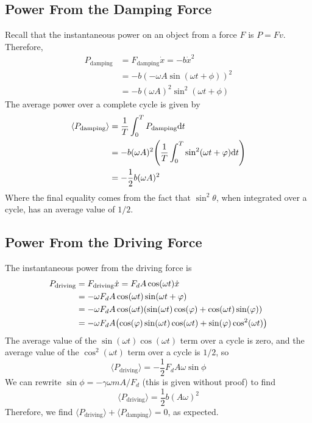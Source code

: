 \subsection*{Power From the Damping Force}
Recall that the instantaneous power on an object from a force $F$ is $P =  Fv$. Therefore, 
\begin{align*}
    P_\text{damping} &= F_\text{damping}\dot x = -b\dot x^2  \\
    &= -b(-\omega A\sin(\omega t+\phi))^2 \\
    &= -b(\omega A)^2\sin^2(\omega t+\phi)
\end{align*}
The average power over a complete cycle is given by
\begin{align*}
    \langle P_\text{damping}\rangle &= \frac{1}{T}\int_0^T P_\text{damping}\dd t \\
    &= -b(\omega A)^2\pqty{\frac{1}{T}\int_0^T \sin^2(\omega t+\phi)\dd t} \\
    &= -\frac{1}{2}b(\omega A)^2
\end{align*}
Where the final equality comes from the fact that $\sin^2 \theta$, when integrated over a cycle, has an average value of $1/2$. 
\subsection*{Power From the Driving Force}
The instantaneous power from the driving force is
\begin{align*}
    P_\text{driving} &= F_\text{driving}\dot x = F_dA\cos(\omega t)\dot x \\
    &= -\omega F_dA\cos(\omega t)\sin(\omega t+\phi) \\
    &= -\omega F_dA\cos(\omega t)\pqty{\sin(\omega t)\cos(\phi) + \cos(\omega t)\sin(\phi)} \\
    &= -\omega F_dA\pqty{\cos(\phi)\sin(\omega t)\cos(\omega t) + \sin(\phi)\cos^2(\omega t)}
\end{align*}
The average value of the $\sin(\omega t)\cos(\omega t)$ term over a cycle is zero, and the average value of the $\cos^2(\omega t)$ term over a cycle is $1/2$, so
\[ \langle P_\text{driving} \rangle = -\frac{1}{2}F_dA\omega\sin\phi \]
We can rewrite $\sin\phi = -\gamma \omega mA/F_d$ (this is given without proof) to find
\[ \langle P_\text{driving}\rangle = \frac{1}2b(A\omega)^2\]
Therefore, we find $\langle P_\text{driving}\rangle + \langle P_\text{damping}\rangle = 0$, as expected. 

